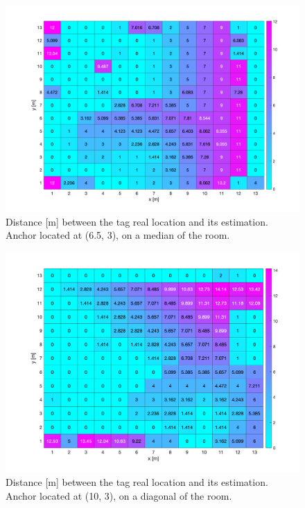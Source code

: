 \begin{figure}[H]
\centering
\includegraphics[width=\linewidth]{Images/65_3.png}
\caption{Distance [m] between the tag real location and its estimation. Anchor located at (6.5, 3), on a median of the room.}
\end{figure}

\begin{figure}[H]
\centering
\includegraphics[width=\linewidth]{Images/10_3.png}
\caption{Distance [m] between the tag real location and its estimation. Anchor located at (10, 3), on a diagonal of the room.}
\end{figure}